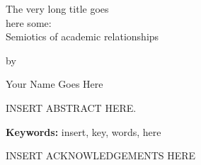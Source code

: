 \vspace{1.2cm}
\begin{center}\begin{spacing}{1}
{\Large The very long title goes\\\smallskip here some:\\\bigskip Semiotics of academic relationships\\}
\vspace{24pt}
{\Large by
\par
\vspace{5pt}
Your Name Goes Here\\[1.2cm]}
\end{spacing}\end{center}
\noindent
\begin{spacing}{1.7}
INSERT ABSTRACT HERE.
\end{spacing}
\begin{spacing}{1}
\vspace{40pt}

\noindent
\textbf{Keywords:} insert, key, words, here
\end{spacing}
\medskip



\newpage
{}
\begin{spacing}{1}
	\ackname
\end{spacing}
INSERT ACKNOWLEDGEMENTS HERE
\newpage



